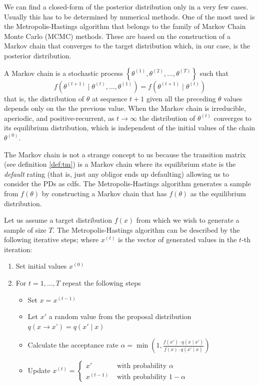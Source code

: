 \documentclass[11pt,fleqn]{book} %
\begin{document}
We can find a closed-form of the posterior distribution only in a very few 
cases. Usually this has to be determined by numerical methods. 
One of the most used is the Metropolis-Hastings algorithm that belongs to 
the family of Markov Chain Monte Carlo (MCMC) methods. These are based on 
the construction of a Markov chain that converges to the target distribution 
which, in our case, is the posterior distribution.

\begin{definition}
	A Markov chain is a stochastic process 
	$\left\{\theta^{(1)},\theta^{(2)},\dots,\theta^{(T)}\right\}$ such that
	\begin{displaymath}
		f\left(\theta^{(t+1)} \mid \theta^{(t)},\dots,\theta^{(1)}\right) = 
		f\left(\theta^{(t+1)} \mid \theta^{(t)}\right)
	\end{displaymath}
	that is, the distribution of $\theta$ at sequence $t+1$ given all the 
	preceding $\theta$ values depends only on the the previous value. 
	When the Markov chain is irreducible, aperiodic, and positive-recurrent, 
	as $t \to \infty$ the distribution of $\theta^{(t)}$ converges to its 
	equilibrium distribution, which is independent of the initial values 
	of the chain $\theta^{(0)}$.
\end{definition}

The Markov chain is not a strange concept to us because the transition 
matrix (see definition \ref{def:tm}) is a Markov chain where its 
equilibrium state is the \emph{default} rating (that is, just any 
obligor ends up defaulting) allowing us to consider the PDs as cdfs.
The Metropolis-Hastings algorithm generates a sample from $f(\theta)$ 
by constructing a Markov chain that has $f(\theta)$ as the equilibrium 
distribution.

\begin{algorithm}
	Let us assume a target distribution $f(x)$ from which we wish to 
	generate a sample of size $T$. The Metropolis-Hastings algorithm can 
	be described by the following iterative steps; where $x^{(t)}$ is the 
	vector of generated values in the $t$-th iteration:
	\begin{enumerate}
		\item Set initial values $x^{(0)}$
		\item For $t=1,\dots,T$ repeat the following steps
		\begin{itemize}
			\item Set $x=x^{(t-1)}$
			\item Let $x'$ a random value from the proposal distribution $q(x \to x’)=q(x' \mid x)$
			\item Calculate the acceptance rate 
			$\alpha = \min\left(1,\frac{f(x') \cdot q(x \mid x')}{f(x) \cdot q(x' \mid x)}\right)$
			\item Update $x^{(t)}=\left\{
			\begin{array}{ll}
				x'        & \text{ with probability } \alpha   \\
				x^{(t-1)} & \text{ with probability } 1-\alpha 
			\end{array}\right.$ 
		\end{itemize}
	\end{enumerate}
\end{algorithm}
\end{document}
